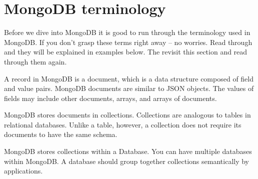 \section{MongoDB terminology}\label{sec:mongodb_terminology}
Before we dive into MongoDB it is good to run through the terminology used in MongoDB. If you don't grasp these terms right away -- no worries. Read through and they will be explained in examples below. The revisit this section and read through them again.

A record in MongoDB is a document, which is a data structure composed of field and value pairs. MongoDB documents are similar to JSON objects. The values of fields may include other documents, arrays, and arrays of documents.

MongoDB stores documents in collections. Collections are analogous to tables in relational databases. Unlike a table, however, a collection does not require its documents to have the same schema.

MongoDB stores collections within a Database. You can have multiple databases within MongoDB. A database should group together collections semantically by applications.
